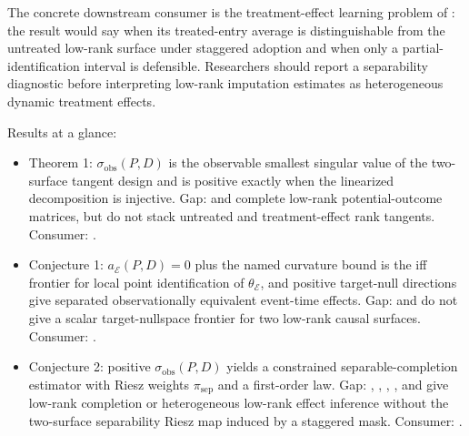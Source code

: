 \documentclass[11pt]{article}
\theoremstyle{definition}
\theoremstyle{plain}
\theoremstyle{remark}
\begin{document}
The concrete downstream consumer is the treatment-effect learning problem of \citet{FariasLiPeng2021}: the result would say when its treated-entry average is distinguishable from the untreated low-rank surface under staggered adoption and when only a partial-identification interval is defensible.  Researchers should report a separability diagnostic before interpreting low-rank imputation estimates as heterogeneous dynamic treatment effects.

Results at a glance:
\begin{itemize}[leftmargin=*]
\item Theorem 1: \(\sigma_{\mathrm{obs}}(P,D)\) is the observable smallest singular value of the two-surface tangent design and is positive exactly when the linearized decomposition is injective.  Gap: \citet{AtheyBayatiDoudchenkoImbensKhosravi2021} and \citet{AgarwalDahlehShahShen2023} complete low-rank potential-outcome matrices, but do not stack untreated and treatment-effect rank tangents.  Consumer: \citet{FariasLiPeng2021}.
\item Conjecture 1: \(a_{\mathcal E}(P,D)=0\) plus the named curvature bound is the iff frontier for local point identification of \(\theta_{\mathcal E}\), and positive target-null directions give separated observationally equivalent event-time effects.  Gap: \citet{FariasLiPeng2021} and \citet{AgarwalDahlehShahShen2023} do not give a scalar target-nullspace frontier for two low-rank causal surfaces.  Consumer: \citet{FariasLiPeng2021}.
\item Conjecture 2: positive \(\sigma_{\mathrm{obs}}(P,D)\) yields a constrained separable-completion estimator with Riesz weights \(\pi_{\mathrm{sep}}\) and a first-order law.  Gap: \citet{ChoiKwonLiao2024}, \citet{ChoiYuan2024}, \citet{YanWainwright2024}, \citet{ChernozhukovHansenLiaoZhu2019}, and \citet{ZhuLiaoHansenChernozhukov2026} give low-rank completion or heterogeneous low-rank effect inference without the two-surface separability Riesz map induced by a staggered mask.  Consumer: \citet{BenMichaelFellerRothstein2022}.
\end{itemize}
\end{document}
